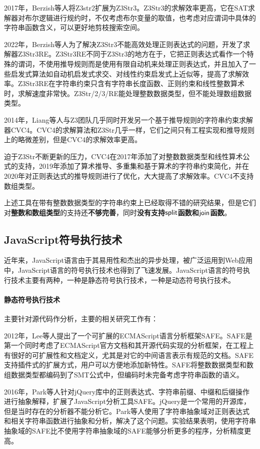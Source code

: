 2017年，Berzish等人\cite{z3str3}将Z3str2扩展为Z3Str3。Z3Str3的求解效率更高，它在SAT求解器对布尔逻辑进行规约时，不仅考虑布尔变量的取值，也考虑对应谓词中具体的字符串函数含义，可以更好地剪枝搜索空间。

2022年，Berzish等人\cite{z3str3re}为了解决Z3Str3不能高效处理正则表达式的问题，开发了求解器Z3Str3RE。Z3Str3RE不同于Z3Str3的地方在于，它把正则表达式看作一个特殊的谓词，不使用推导规则而是使用有限自动机来处理正则表达式，并且加入了一些启发式算法如自动机启发式求交、对线性约束启发式上近似等，提高了求解效率。Z3Str3RE在字符串约束只含有字符串长度函数、正则约束和线性整数算术时，求解速度非常快。Z3Str/2/3/RE能处理整数数据类型，但不能处理数组数据类型。

2014年，Liang等人\cite{cvc4_2014}与Z3团队几乎同时开发另一个基于推导规则的字符串约束求解器CVC4。CVC4的求解算法和Z3Str几乎一样，它们之间只有工程实现和推导规则上的略微差别，但是CVC4的求解效率更高。

迫于Z3Str不断更新的压力，CVC4在2017年\cite{cvc4_2017}添加了对整数数据类型和线性算术公式的支持，2019年\cite{cvc4_2019}添加了算术推导、多重集和基于算术的字符串约束简化，并在2020年\cite{cvc4_2020}对正则表达式的推导规则进行了优化，大大提高了求解效率。CVC4不支持数组类型。

上述工具在带有整数数据类型的字符串约束上已经取得不错的研究结果，但是它们对\textbf{整数和数组类型}的支持还\textbf{不够完善}，同时\textbf{没有支持$\mathsf{split}$函数和$\mathsf{join}$函数}。
\subsection{JavaScript符号执行技术}
近年来，JavaScript语言由于其易用性和杰出的异步处理，被广泛运用到Web应用中，JavaScript语言的符号执行技术也得到了飞速发展。JavaScript语言的符号执行技术主要有两种，一种是静态符号执行技术，一种是动态符号执行技术。

\paragraph{静态符号执行技术} 主要针对源代码作分析，主要的相关研究工作有：

2012年，Lee等人\cite{safe}提出了一个可扩展的ECMAScript语言分析框架SAFE。SAFE是第一个同时考虑了ECMAScript官方文档和其开源代码实现的分析框架，在工程上有很好的可扩展性和文档定义，尤其是对它的中间语言表示有规范的文档。SAFE支持插件式的扩展方式，用户可以方便地添加新特性。SAFE将整数数据类型和数组数据类型都编码到了SMT公式中，但编码时未完备考虑字符串函数的语义。

2016年，Park等人\cite{safe_ext}针对jQuery库中的正则表达式、字符串前缀、中缀和后缀操作进行抽象解释，扩展了JavaScript分析工具SAFE。jQuery是一个常用的开源库，但是当时存在的分析器不能分析它。Park等人使用了字符串抽象域对正则表达式和相关字符串函数进行抽象和分析，解决了这个问题。实验结果表明，使用字符串抽象域的SAFE比不使用字符串抽象域的SAFE能够分析更多的程序，分析精度更高。

